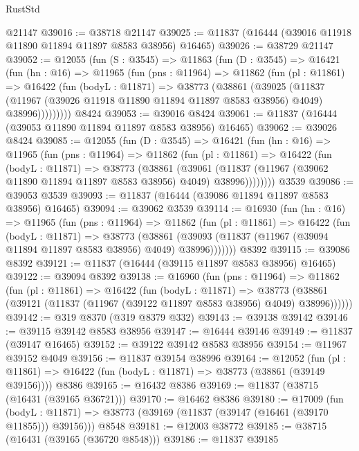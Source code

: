 \begin{lexlean}{RustStd}
\begin{coremodule}
{\begin{coremodule}
{{{{{{{{{{{{{{{{{{{{{{{{{{{{{{{{{{{{{{{{{{{{{{{{{{    @21147
@39016 := @38718 @21147
@39025 := @11837 (@16444 (@39016 @11918 @11890 @11894 @11897 @8583 @38956) @16465)
@39026 := @38729 @21147
@39052 := @12055
    (fun (S : @3545) =>
    @11863
      (fun (D : @3545) =>
      @16421
        (fun (hn : @16) =>
        @11965
          (fun (pns : @11964) =>
          @11862
            (fun (pl : @11861) =>
            @16422
              (fun (bodyL : @11871) =>
              @38773
                (@38861
                  (@39025
                    (@11837
                      (@11967 (@39026 @11918 @11890 @11894 @11897 @8583 @38956) @4049)
                      @38996)))))))))
    @8424
@39053 := @39016 @8424
@39061 := @11837 (@16444 (@39053 @11890 @11894 @11897 @8583 @38956) @16465)
@39062 := @39026 @8424
@39085 := @12055
    (fun (D : @3545) =>
    @16421
      (fun (hn : @16) =>
      @11965
        (fun (pns : @11964) =>
        @11862
          (fun (pl : @11861) =>
          @16422
            (fun (bodyL : @11871) =>
            @38773
              (@38861
                (@39061
                  (@11837 (@11967 (@39062 @11890 @11894 @11897 @8583 @38956) @4049) @38996))))))))
    @3539
@39086 := @39053 @3539
@39093 := @11837 (@16444 (@39086 @11894 @11897 @8583 @38956) @16465)
@39094 := @39062 @3539
@39114 := @16930
    (fun (hn : @16) =>
    @11965
      (fun (pns : @11964) =>
      @11862
        (fun (pl : @11861) =>
        @16422
          (fun (bodyL : @11871) =>
          @38773
            (@38861 (@39093 (@11837 (@11967 (@39094 @11894 @11897 @8583 @38956) @4049) @38996)))))))
    @8392
@39115 := @39086 @8392
@39121 := @11837 (@16444 (@39115 @11897 @8583 @38956) @16465)
@39122 := @39094 @8392
@39138 := @16960
    (fun (pns : @11964) =>
    @11862
      (fun (pl : @11861) =>
      @16422
        (fun (bodyL : @11871) =>
        @38773 (@38861 (@39121 (@11837 (@11967 (@39122 @11897 @8583 @38956) @4049) @38996))))))
@39142 := @319 @8370 (@319 @8379 @332)
@39143 := @39138 @39142
@39146 := @39115 @39142 @8583 @38956
@39147 := @16444 @39146
@39149 := @11837 (@39147 @16465)
@39152 := @39122 @39142 @8583 @38956
@39154 := @11967 @39152 @4049
@39156 := @11837 @39154 @38996
@39164 := @12052
    (fun (pl : @11861) => @16422 (fun (bodyL : @11871) => @38773 (@38861 (@39149 @39156))))
    @8386
@39165 := @16432 @8386
@39169 := @11837 (@38715 (@16431 (@39165 @36721)))
@39170 := @16462 @8386
@39180 := @17009
    (fun (bodyL : @11871) => @38773 (@39169 (@11837 (@39147 (@16461 (@39170 @11855))) @39156)))
    @8548
@39181 := @12003 @38772
@39185 := @38715 (@16431 (@39165 (@36720 @8548)))
@39186 := @11837 @39185
}}}}}}}}}}}}}}}}}}}}}}}}}}}}}}}}}}}}}}}}}}}}}}}}}}
\end{coremodule}}
\end{coremodule}
\end{lexlean}
